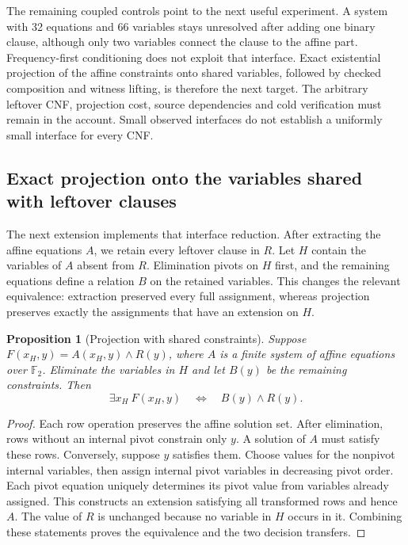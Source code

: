\documentclass[11pt,a4paper]{article}
\numberwithin{equation}{section}
\theoremstyle{plain}
\newtheorem{proposition}[lemma]{Proposition}
\theoremstyle{definition}
\theoremstyle{remark}
\begin{document}
The remaining coupled controls point to the next useful experiment. A system with 32 equations and 66 variables stays unresolved after adding one binary clause, although only two variables connect the clause to the affine part. Frequency-first conditioning does not exploit that interface. Exact existential projection of the affine constraints onto shared variables, followed by checked composition and witness lifting, is therefore the next target. The arbitrary leftover CNF, projection cost, source dependencies and cold verification must remain in the account. Small observed interfaces do not establish a uniformly small interface for every CNF.

\subsection{Exact projection onto the variables shared with leftover clauses}
\label{sec:affine-coupling-projection}

The next extension implements that interface reduction. After extracting the affine equations $A$, we retain every leftover clause in $R$. Let $H$ contain the variables of $A$ absent from $R$. Elimination pivots on $H$ first, and the remaining equations define a relation $B$ on the retained variables. This changes the relevant equivalence: extraction preserved every full assignment, whereas projection preserves exactly the assignments that have an extension on $H$.

\begin{proposition}[Projection with shared constraints]
\label{prop:affine-coupling-projection}
Suppose $F(x_H,y)=A(x_H,y)\land R(y)$, where $A$ is a finite system of affine equations over $\mathbb F_2$. Eliminate the variables in $H$ and let $B(y)$ be the remaining constraints. Then
\[
 \exists x_H\ F(x_H,y)\quad\Longleftrightarrow\quad B(y)\land R(y).
\]
\end{proposition}

\begin{proof}
Each row operation preserves the affine solution set. After elimination, rows without an internal pivot constrain only $y$. A solution of $A$ must satisfy these rows. Conversely, suppose $y$ satisfies them. Choose values for the nonpivot internal variables, then assign internal pivot variables in decreasing pivot order. Each pivot equation uniquely determines its pivot value from variables already assigned. This constructs an extension satisfying all transformed rows and hence $A$. The value of $R$ is unchanged because no variable in $H$ occurs in it. Combining these statements proves the equivalence and the two decision transfers.
\end{proof}
\end{document}
